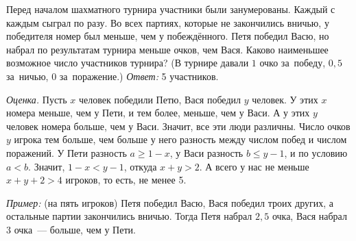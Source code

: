 \problem{}
Перед началом шахматного турнира участники были занумерованы.
Каждый с каждым сыграл по разу.
Во всех партиях, которые не закончились вничью, у победителя номер был меньше,
чем у побеждённого.
Петя победил Васю, но набрал по результатам турнира меньше очков, чем Вася.
Каково наименьшее возможное число участников турнира?
(В турнире давали $1$ очко за~победу, $0{,}5$ за~ничью, $0$ за~поражение.)
\solution
\emph{Ответ:} 5 участников.
\par
\emph{Оценка.}
Пусть $x$ человек победили Петю, Вася победил $y$ человек.
У этих $x$ номера меньше, чем у Пети, и тем более, меньше, чем у Васи.
А у этих $y$ человек номера больше, чем у Васи.
Значит, все эти люди различны.
Число очков $y$ игрока тем больше, чем больше у него разность между числом
побед и числом поражений.
У Пети разность $a \geq 1 - x$, у Васи разность $b \leq y - 1$, и по условию
$a < b$.
Значит, $1 - x < y - 1$, откуда $x + y > 2$.
А всего у нас не меньше $x + y + 2 > 4$ игроков, то есть, не менее 5.
\par
\emph{Пример:} (на пять игроков)
Петя победил Васю, Вася победил троих других, а остальные партии закончились
вничью.
Тогда Петя набрал $2{,}5$ очка, Вася набрал 3 очка~--- больше, чем у Пети.
\endproblem
